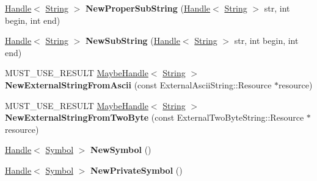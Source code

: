 \begin{DoxyCompactItemize}
\item 
\hypertarget{classv8_1_1internal_1_1_v8___f_i_n_a_l_af6e221f735f8495736a8cd1b6551993f}{}\hyperlink{classv8_1_1internal_1_1_handle}{Handle}$<$ \hyperlink{classv8_1_1internal_1_1_string}{String} $>$ {\bfseries New\+Proper\+Sub\+String} (\hyperlink{classv8_1_1internal_1_1_handle}{Handle}$<$ \hyperlink{classv8_1_1internal_1_1_string}{String} $>$ str, int begin, int end)\label{classv8_1_1internal_1_1_v8___f_i_n_a_l_af6e221f735f8495736a8cd1b6551993f}

\item 
\hypertarget{classv8_1_1internal_1_1_v8___f_i_n_a_l_a0fea095839750127cb9d8ef96e84c31f}{}\hyperlink{classv8_1_1internal_1_1_handle}{Handle}$<$ \hyperlink{classv8_1_1internal_1_1_string}{String} $>$ {\bfseries New\+Sub\+String} (\hyperlink{classv8_1_1internal_1_1_handle}{Handle}$<$ \hyperlink{classv8_1_1internal_1_1_string}{String} $>$ str, int begin, int end)\label{classv8_1_1internal_1_1_v8___f_i_n_a_l_a0fea095839750127cb9d8ef96e84c31f}

\item 
\hypertarget{classv8_1_1internal_1_1_v8___f_i_n_a_l_a742b826252e79d0366c0125999a9eed4}{}M\+U\+S\+T\+\_\+\+U\+S\+E\+\_\+\+R\+E\+S\+U\+L\+T \hyperlink{classv8_1_1internal_1_1_maybe_handle}{Maybe\+Handle}$<$ \hyperlink{classv8_1_1internal_1_1_string}{String} $>$ {\bfseries New\+External\+String\+From\+Ascii} (const External\+Ascii\+String\+::\+Resource $\ast$resource)\label{classv8_1_1internal_1_1_v8___f_i_n_a_l_a742b826252e79d0366c0125999a9eed4}

\item 
\hypertarget{classv8_1_1internal_1_1_v8___f_i_n_a_l_a57d6ca0439ced17c8bac894defe1e91a}{}M\+U\+S\+T\+\_\+\+U\+S\+E\+\_\+\+R\+E\+S\+U\+L\+T \hyperlink{classv8_1_1internal_1_1_maybe_handle}{Maybe\+Handle}$<$ \hyperlink{classv8_1_1internal_1_1_string}{String} $>$ {\bfseries New\+External\+String\+From\+Two\+Byte} (const External\+Two\+Byte\+String\+::\+Resource $\ast$resource)\label{classv8_1_1internal_1_1_v8___f_i_n_a_l_a57d6ca0439ced17c8bac894defe1e91a}

\item 
\hypertarget{classv8_1_1internal_1_1_v8___f_i_n_a_l_aebf7f007e763db83f7210cc5baf67cd4}{}\hyperlink{classv8_1_1internal_1_1_handle}{Handle}$<$ \hyperlink{classv8_1_1internal_1_1_symbol}{Symbol} $>$ {\bfseries New\+Symbol} ()\label{classv8_1_1internal_1_1_v8___f_i_n_a_l_aebf7f007e763db83f7210cc5baf67cd4}

\item 
\hypertarget{classv8_1_1internal_1_1_v8___f_i_n_a_l_a456b6298bb79ef7d71680e87086e195b}{}\hyperlink{classv8_1_1internal_1_1_handle}{Handle}$<$ \hyperlink{classv8_1_1internal_1_1_symbol}{Symbol} $>$ {\bfseries New\+Private\+Symbol} ()\label{classv8_1_1internal_1_1_v8___f_i_n_a_l_a456b6298bb79ef7d71680e87086e195b}


\end{DoxyCompactItemize}
